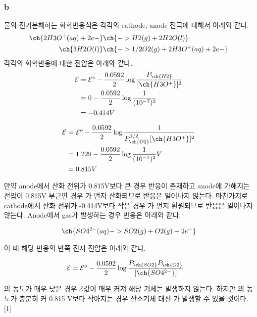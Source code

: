 \documentclass[%
 reprint,
 amsmath,amssymb,
 aps,
]{revtex4-2}
\begin{document}
\subsubsection{\label{sec:level3}b}
물의 전기분해하는 화학반응식은 각각의 cathode, anode 전극에 대해서 아래와 같다.
\begin{align}
	\ch{2 H3O^{+}(aq) + 2 e-}&\ch{ -> H2(g) + 2 H2O(l)} \\
	\ch{3 H2O(l)} &\ch{-> 1/2  O2(g) + 2 H3O^{+}(aq) + 2 e-}
\end{align}
각각의 화학반응에 대한 전압은 아래와 같다.
\begin{align}
	\mathcal{E} &= \mathcal{E}^{o} - \frac{0.0592}{2}\log{\frac{P_{\ch{H2}}}{[\ch{H3O^{+}}]^{2}}}\\
	&=0 - \frac{0.0592}{2}\log{\frac{1}{(10^{-7})^{2}}}\\
	&= -0.414V
\end{align}

\begin{align}
	\mathcal{E} &= \mathcal{E}^{o} - \frac{0.0592}{2}\log{\frac{1}{P_{\ch{O2}}^{1/2}[\ch{H3O^{+}}]^{2}}}\\
	&=1.229 - \frac{0.0592}{2}\log{\frac{1}{(10^{-7})^{2}}} V \\
	&= 0.815 V
\end{align}

만약 anode에서 산화 전위가 0.815V보다 큰 경우 반응이 존재하고 anode에 가해지는 전압이 0.815V 부근인 경우 가 먼저 산화되므로 반응은 일어나지 않는다. 마찬가지로 cathode에서 산화 전위가 -0.414V보다 작은 경우 가 먼저 환원되므로 반응은 일어나지 않는다. Anode에서  gas가 발생하는 경우 반응은 아래와 같다.

\begin{align}
	\ch{SO4^{2-}(aq) -> SO2(g) + O2(g) + 2 e^{-}}
\end{align}

이 때 해당 반응의 반쪽 전지 전압은 아래와 같다.

\begin{align}
	\mathcal{E} &= \mathcal{E}^{o} - \frac{0.0592}{2}\log{\frac{P_{\ch{SO2}}P_{\ch{O2}}}{[\ch{SO4^{2-}}]}}
\end{align}

의 농도가 매우 낮은 경우 $\mathcal{E}$값이 매우 커져 해당 기체는 발생하지 않는다. 하지만 의 농도가 충분히 커 0.815 V보다 작아지는 경우 산소기체 대신 가 발생할 수 있을 것이다.[1]
\end{document}
